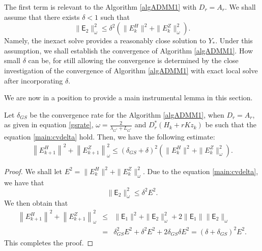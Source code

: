 The first term is relevant to the Algorithm \ref{algADMM1} with $D_r = A_r$. We shall assume that there exists $\delta < 1$ such that 
\begin{equation}\label{main:cvdelta}
\|\textsf{E}_2\|_\omega^2 \leq \delta^2 \left ( \|E_k^H\|^2 + \|E_k^Z\|_\omega^2 \right ).
\end{equation}
Namely, the inexact solve provides a reasonably close solution to $Y_*$. Under this assumption, we shall establish the convergence of Algorithm \ref{algADMM1}. How small $\delta$ can be, for still allowing the convergence is determined by the close investigation of the convergence of Algorithm \ref{algADMM1} with exact local solve after incorporating $\delta$.   

We are now in a position to provide a main instrumental lemma in this section. 
\begin{theorem}\label{main:ins}
Let $\delta_{GS}$ be the convergence rate for the Algorithm \ref{algADMM1}, when $D_r = A_r$, as given in equation \eqref{gsrate}, $\omega = \frac{2}{\lambda_{G^*} + L_{G^*}}$ and $D_r^*(H_k + rKz_k)$ be such that the equation \eqref{main:cvdelta} hold. Then, we have the following estimate:   
\begin{eqnarray*}
\left \|E_{k+1}^H \right \|^2 + \left \|E_{k+1}^Z \right \|_\omega^2 \leq \left ( \delta_{GS} + \delta \right )^2 \left ( \|E_k^H\|^2 + \|E_k^Z\|_\omega^2 \right ). 
\end{eqnarray*}
\end{theorem} 
\begin{proof}
We shall let $E^2 = \|E_k^H\|^2 + \|E_k^Z\|_\omega^2$. Due to the equation \eqref{main:cvdelta}, we have that 
\begin{equation}
\|\textsf{E}_2\|_\omega^2 \leq \delta^2 E^2. 
\end{equation}
We then obtain that 
\begin{eqnarray*}
\left \|E_{k+1}^H \right \|^2 + \left \|E_{k+1}^Z \right \|_\omega^2 &\leq& \|\textsf{E}_1\|^2 + \|\textsf{E}_2\|_\omega^2 + 2 \|\textsf{E}_1\| \|\textsf{E}_2\|_\omega  \\ 
&=& \delta_{GS}^2 E^2 + \delta^2 E^2 + 2 \delta_{GS} \delta E^2 = (\delta + \delta_{GS})^2 E^2. 
\end{eqnarray*}
This completes the proof. 
\end{proof}

